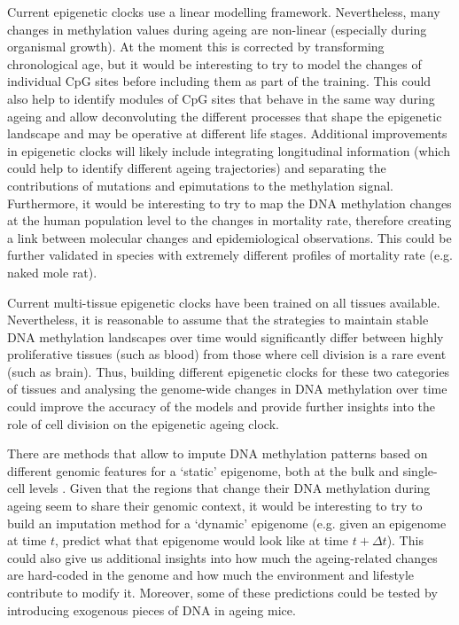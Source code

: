 \bigskip

Current epigenetic clocks use a linear modelling framework. Nevertheless, many changes in methylation values during ageing are non-linear (especially during organismal growth). At the moment this is corrected by transforming chronological age, but it would be interesting to try to model the changes of individual CpG sites before including them as part of the training. This could also help to identify modules of CpG sites that behave in the same way during ageing and allow deconvoluting the different processes that shape the epigenetic landscape and may be operative at different life stages. Additional improvements in epigenetic clocks will likely include integrating longitudinal information (which could help to identify different ageing trajectories) \cite{Jensen2014} and separating the contributions of mutations and epimutations to the methylation signal. Furthermore, it would be interesting to try to map the DNA methylation changes at the human population level to the changes in mortality rate, therefore creating a link between molecular changes and epidemiological observations. This could be further validated in species with extremely different profiles of mortality rate (e.g. naked mole rat).

\bigskip

Current multi-tissue epigenetic clocks have been trained on all tissues available. Nevertheless, it is reasonable to assume that the strategies to maintain stable DNA methylation landscapes over time would significantly differ between highly proliferative tissues (such as blood) from those where cell division is a rare event (such as brain). Thus, building different epigenetic clocks for these two categories of tissues and analysing the genome-wide changes in DNA methylation over time could improve the accuracy of the models and provide further insights into the role of cell division on the epigenetic ageing clock.

\bigskip

There are methods that allow to impute DNA methylation patterns based on different genomic features for a `static' epigenome, both at the bulk \cite{Zhang2015} and single-cell levels \cite{Angermueller2017,Kapourani2019}. Given that the regions that change their DNA methylation during ageing seem to share their genomic context, it would be interesting to try to build an imputation method for a `dynamic' epigenome (e.g. given an epigenome at time $t$, predict what that epigenome would look like at time $t + \Delta t$). This could also give us additional insights into how much the ageing-related changes are hard-coded in the genome and how much the environment and lifestyle contribute to modify it. Moreover, some of these predictions could be tested by introducing exogenous pieces of DNA in ageing mice.


